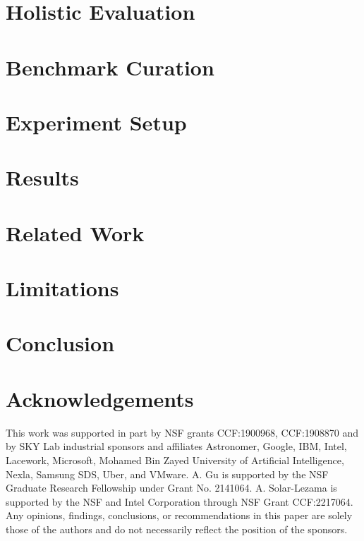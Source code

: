 \documentclass[letterpaper,11pt]{article}
\begin{document}


\section{Holistic Evaluation}
\label{sec:tasks}


\section{Benchmark Curation}
\label{sec:benchmark}


\section{Experiment Setup}
\label{sec:setup}


\section{Results}
\label{sec:results}


\section{Related Work}
\label{sec:related-work}


\section{Limitations}


\section{Conclusion}
\label{sec:conclusion}





\section*{Acknowledgements}
This work was supported in part by NSF grants CCF:1900968, CCF:1908870 and by SKY Lab industrial sponsors and affiliates Astronomer, Google, IBM, Intel, Lacework, Microsoft, Mohamed Bin Zayed University of Artificial Intelligence, Nexla, Samsung SDS, Uber, and VMware. 
A. Gu is supported by the NSF Graduate Research Fellowship under Grant No. 2141064. 
A. Solar-Lezama is supported by the NSF and Intel Corporation through NSF Grant CCF:2217064.
Any opinions, findings, conclusions, or recommendations in this paper are solely those of the authors and do not necessarily reflect the position of the sponsors. 
\end{document}
